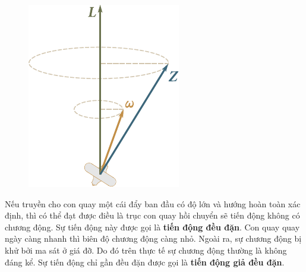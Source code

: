 \begin{figure}[!htb]
	\begin{center}
		\includegraphics[scale=1.2]{figures/ch_05/fig_5_31.pdf}
		\caption[]{}
		\label{fig:5_31}
	\end{center}
\end{figure}

Nếu truyền cho con quay một cái đẩy ban đầu có độ lớn và hướng hoàn toàn xác định, thì có thể đạt được điều là trục con quay hồi chuyển sẽ tiến động không có chương động. Sự tiến động này được gọi là \textbf{tiến động đều đặn}. Con quay quay ngày càng nhanh thì biên độ chương động càng nhỏ. Ngoài ra, sự chương động bị khử bởi ma sát ở giá đỡ. Do đó trên thực tế sự chương động thường là không đáng kể. Sự tiến động chỉ gần đều đặn được gọi là \textbf{tiến động giả đều đặn}.

